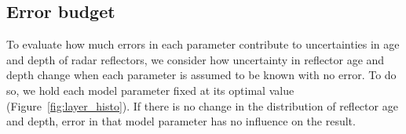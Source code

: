








\subsection{Error budget}
To evaluate how much errors in each parameter contribute to uncertainties in age and depth of radar reflectors, we consider how uncertainty in reflector age and depth change when each parameter is assumed to be known with no error. To do so, we hold each model parameter fixed at its optimal value (Figure~\ref{fig:layer_histo}). If there is no change in the distribution of reflector age and depth, error in that model parameter has no influence on the result.

